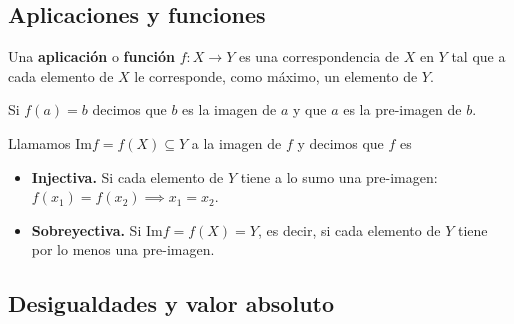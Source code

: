\subsection{Aplicaciones y funciones}
\begin{definition}
    Una \textbf{aplicación} o \textbf{función} $f:X\to Y$ es una correspondencia de $X$ en $Y$ tal que a cada elemento de $X$ le corresponde, como máximo, un elemento de $Y$.
\end{definition}
\begin{definition}
    Si $f\left( a \right) = b$ decimos que $b$ es la imagen de $a$ y que $a$ es la pre-imagen de $b$.
\end{definition}
\begin{definition}
    Llamamos Im$f = f\left( X \right) \subseteq Y$ a la imagen de $f$ y decimos que $f$ es
    \begin{itemize}
        \item\textbf{Injectiva.} Si cada elemento de $Y$ tiene a lo sumo una pre-imagen: $f\left( x_1 \right) = f\left( x_2 \right) \implies x_1 = x_2$.
        \item\textbf{Sobreyectiva.} Si Im$f = f\left( X \right) = Y$, es decir, si cada elemento de $Y$ tiene por lo menos una pre-imagen. 
    \end{itemize}
\end{definition}

\subsection{Desigualdades y valor absoluto}

